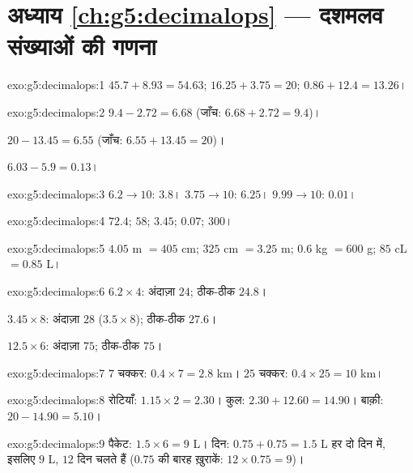 \section*{अध्याय \ref{ch:g5:decimalops} --- दशमलव संख्याओं की गणना}

\begin{solution}{exo:g5:decimalops:1}
$45.7 + 8.93 = 54.63$; \quad
$16.25 + 3.75 = 20$; \quad
$0.86 + 12.4 = 13.26$।
\end{solution}

\begin{solution}{exo:g5:decimalops:2}
$9.4 - 2.72 = 6.68$ (जाँच: $6.68 + 2.72 = 9.4$)।

$20 - 13.45 = 6.55$ (जाँच: $6.55 + 13.45 = 20$)।

$6.03 - 5.9 = 0.13$।
\end{solution}

\begin{solution}{exo:g5:decimalops:3}
$6.2 \to 10$: $3.8$। \quad $3.75 \to 10$: $6.25$। \quad
$9.99 \to 10$: $0.01$।
\end{solution}

\begin{solution}{exo:g5:decimalops:4}
$72.4$; \quad $58$; \quad $3.45$; \quad $0.07$; \quad $300$।
\end{solution}

\begin{solution}{exo:g5:decimalops:5}
$4.05$ m $= 405$ cm; \quad $325$ cm $= 3.25$ m; \quad
$0.6$ kg $= 600$ g; \quad $85$ cL $= 0.85$ L।
\end{solution}

\begin{solution}{exo:g5:decimalops:6}
$6.2 \times 4$: अंदाज़ा $24$; ठीक-ठीक $24.8$।

$3.45 \times 8$: अंदाज़ा $28$ ($3.5 \times 8$); ठीक-ठीक $27.6$।

$12.5 \times 6$: अंदाज़ा $75$; ठीक-ठीक $75$।
\end{solution}

\begin{solution}{exo:g5:decimalops:7}
$7$ चक्कर: $0.4 \times 7 = 2.8$ km। $25$ चक्कर:
$0.4 \times 25 = 10$ km।
\end{solution}

\begin{solution}{exo:g5:decimalops:8}
रोटियाँ: $1.15 \times 2 = 2.30$। कुल: $2.30 + 12.60 = 14.90$।
बाक़ी: $20 - 14.90 = 5.10$।
\end{solution}

\begin{solution}{exo:g5:decimalops:9}
पैकेट: $1.5 \times 6 = 9$ L। दिन: $0.75 + 0.75 = 1.5$ L हर दो
दिन में, इसलिए $9$ L, $12$ दिन चलते हैं ($0.75$ की बारह ख़ुराकें:
$12 \times 0.75 = 9$)।
\end{solution}

